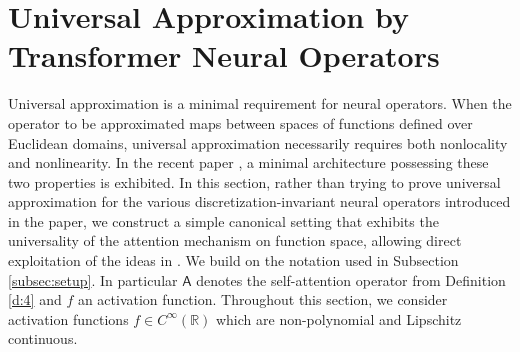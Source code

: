 \documentclass[twoside]{article}
\newcommand{\1}{\mathbbm{1}}
\newcommand{\R}{\mathbbm{R}}
\newcommand{\sA}{\mathsf{A}}
\providecommand{\mathbbm}{\mathbb} %
\begin{document}
\section{Universal Approximation by Transformer Neural Operators}
\label{sec:universal_approx}


Universal approximation is a minimal requirement for neural operators. When the operator to be
approximated maps between spaces of functions defined over Euclidean domains, universal approximation
necessarily requires both nonlocality and nonlinearity. In the recent paper \citet{lanthaler2023nonlocal},
a minimal architecture possessing these two properties is exhibited. In this section, rather than
trying to prove universal approximation for the various discretization-invariant neural operators
introduced in the paper, we construct a simple canonical setting that exhibits the universality of the attention mechanism on function space, allowing direct exploitation of the ideas in \citet{lanthaler2023nonlocal}. We build on the notation used in Subsection \ref{subsec:setup}. In particular
$\sA$ denotes the self-attention operator from Definition \ref{d:4} and $f$ an activation function. Throughout this section, we consider activation functions $f \in C^\infty(\R)$ which are non-polynomial and Lipschitz continuous.
\end{document}
